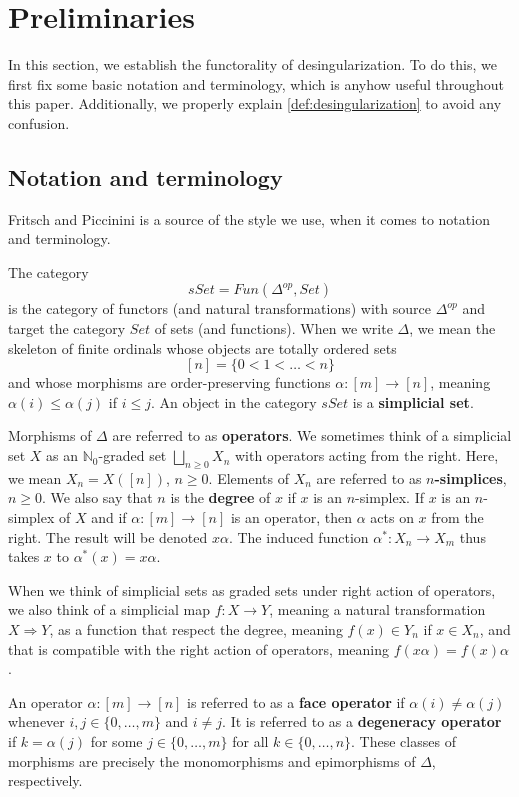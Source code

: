 

\section{Preliminaries}
\label{sec:prelim}

In this section, we establish the functorality of desingularization. To do this, we first fix some basic notation and terminology, which is anyhow useful throughout this paper. Additionally, we properly explain \cref{def:desingularization} to avoid any confusion.

\subsection{Notation and terminology}

Fritsch and Piccinini \cite{FP90} is a source of the style we use, when it comes to notation and terminology.

The category
\[sSet=Fun(\Delta ^{op},Set)\]
is the category of functors (and natural transformations) with source $\Delta ^{op}$ and target the category $Set$ of sets (and functions). When we write $\Delta$, we mean the skeleton of finite ordinals whose objects are totally ordered sets
\[[n]=\{ 0<1<\dots <n\}\]
and whose morphisms are order-preserving functions $\alpha :[m]\to [n]$, meaning $\alpha (i)\leq \alpha (j)$ if $i\leq j$. An object in the category $sSet$ is a \textbf{simplicial set}.

Morphisms of $\Delta$ are referred to as \textbf{operators}. We sometimes think of a simplicial set $X$ as an $\mathbb{N} _0$-graded set $\bigsqcup _{n\geq 0}X_n$ with operators acting from the right. Here, we mean $X_n=X([n])$, $n\geq 0$. Elements of $X_n$ are referred to as \textbf{$n$-simplices}, $n\geq 0$. We also say that $n$ is the \textbf{degree} of $x$ if $x$ is an $n$-simplex. If $x$ is an $n$-simplex of $X$ and if $\alpha :[m]\to [n]$ is an operator, then $\alpha$ acts on $x$ from the right. The result will be denoted $x\alpha$. The induced function $\alpha ^*:X_n\to X_m$ thus takes $x$ to $\alpha ^*(x)=x\alpha$.

When we think of simplicial sets as graded sets under right action of operators, we also think of a simplicial map $f:X\to Y$, meaning a natural transformation $X\Rightarrow Y$, as a function that respect the degree, meaning $f(x)\in Y_n$ if $x\in X_n$, and that is compatible with the right action of operators, meaning $f(x\alpha )=f(x)\alpha$.

An operator $\alpha :[m]\to [n]$ is referred to as a \textbf{face operator} if $\alpha (i)\neq \alpha (j)$ whenever $i,j\in \{0,\dots ,m\}$ and $i\neq j$. It is referred to as a \textbf{degeneracy operator} if $k=\alpha (j)$ for some $j\in \{0,\dots ,m\}$ for all $k\in \{0,\dots ,n\}$. These classes of morphisms are precisely the monomorphisms and epimorphisms of $\Delta$, respectively.

